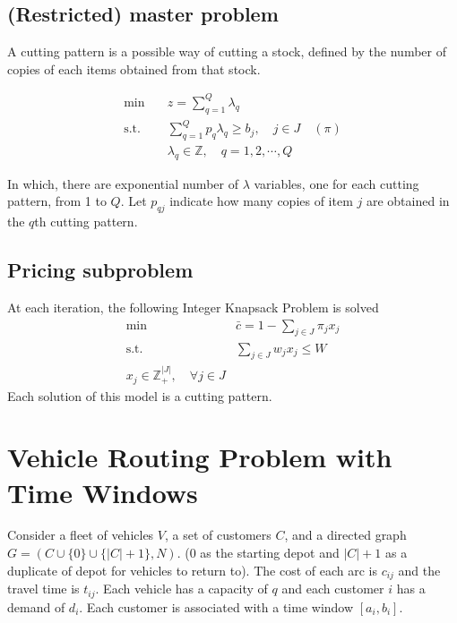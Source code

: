         \subsection{(Restricted) master problem}
            A cutting pattern is a possible way of cutting a stock, defined by the number of copies of each items obtained from that stock.

            \begin{align*}
                \min \quad & z = \sum_{q = 1}^Q \lambda_q\\
                \text{s.t.} \quad & \sum_{q = 1}^Q p_{q} \lambda_q \ge b_j, \quad j \in J \quad (\pi)\\
                &\lambda_q \in \mathbb{Z}, \quad q = 1, 2, \cdots, Q
            \end{align*}

            In which, there are exponential number of $\lambda$ variables, one for each cutting pattern, from 1 to $Q$. Let $p_{qj}$ indicate how many copies of item $j$ are obtained in the $q$th cutting pattern.

        \subsection{Pricing subproblem}
            At each iteration, the following Integer Knapsack Problem is solved
            \begin{align*}
                \min \quad &\bar{c} = 1 - \sum_{j \in J} \pi_j x_j\\
                \text{s.t.} \quad & \sum_{j \in J} w_j x_j \le W\\
                x_j \in \mathbb{Z}_+^{|J|}, \quad \forall j \in J
            \end{align*}
            Each solution of this model is a cutting pattern.
        
    \section{Vehicle Routing Problem with Time Windows}
        Consider a fleet of vehicles $V$, a set of customers $C$, and a directed graph $G = (C\cup\{0\}\cup\{|C| + 1\}, N)$. (0 as the starting depot and $|C| + 1$ as a duplicate of depot for vehicles to return to). The cost of each arc is $c_{ij}$ and the travel time is $t_{ij}$. Each vehicle has a capacity of $q$ and each customer $i$ has a demand of $d_i$. Each customer is associated with a time window $[a_i, b_i]$.

